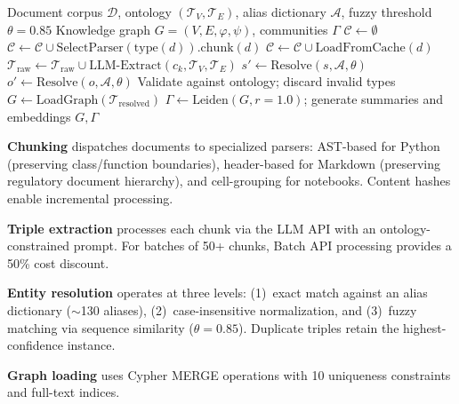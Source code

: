 \documentclass[review]{elsarticle}
\begin{document}
\begin{algorithm}[t]
\caption{Ingestion Pipeline}
\label{alg:ingestion}
\footnotesize
\begin{algorithmic}[1]
\Require Document corpus $\mathcal{D}$, ontology $(\mathcal{T}_V, \mathcal{T}_E)$, alias dictionary $\mathcal{A}$, fuzzy threshold $\theta = 0.85$
\Ensure Knowledge graph $G = (V, E, \varphi, \psi)$, communities $\Gamma$
\State $\mathcal{C} \gets \emptyset$
        \State $\mathcal{C} \gets \mathcal{C} \cup \text{SelectParser}(\text{type}(d)).\text{chunk}(d)$
    \Else
        \State $\mathcal{C} \gets \mathcal{C} \cup \text{LoadFromCache}(d)$
    \EndIf
\EndFor
{} 
    \State $\mathcal{T}_{\text{raw}} \gets \mathcal{T}_{\text{raw}} \cup \text{LLM-Extract}(c_k, \mathcal{T}_V, \mathcal{T}_E)$
\EndFor
{}
    \State $s' \gets \text{Resolve}(s, \mathcal{A}, \theta)$ 
    \State $o' \gets \text{Resolve}(o, \mathcal{A}, \theta)$
    \State Validate against ontology; discard invalid types
\EndFor
\State $G \gets \text{LoadGraph}(\mathcal{T}_{\text{resolved}})$ 
\State $\Gamma \gets \text{Leiden}(G, r=1.0)$; generate summaries and embeddings
\State \Return $G, \Gamma$
\end{algorithmic}
\end{algorithm}

\textbf{Chunking} dispatches documents to specialized parsers: AST-based for Python (preserving class/function boundaries), header-based for Markdown (preserving regulatory document hierarchy), and cell-grouping for notebooks. Content hashes enable incremental processing.

\textbf{Triple extraction} processes each chunk via the LLM API with an ontology-constrained prompt. For batches of 50+ chunks, Batch API processing provides a 50\% cost discount.

\textbf{Entity resolution} operates at three levels: (1)~exact match against an alias dictionary ($\sim$130 aliases), (2)~case-insensitive normalization, and (3)~fuzzy matching via sequence similarity ($\theta = 0.85$). Duplicate triples retain the highest-confidence instance.

\textbf{Graph loading} uses Cypher MERGE operations with 10 uniqueness constraints and full-text indices.
\end{document}

